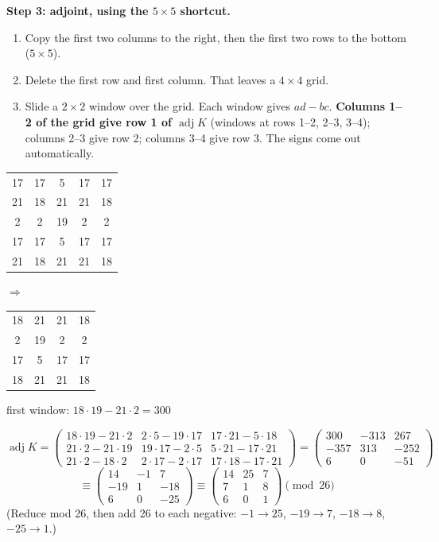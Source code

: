 \textbf{Step 3: adjoint, using the $5\times5$ shortcut.}
\begin{enumerate}[leftmargin=1.5em]
  \item Copy the first two columns to the right, then the first two rows to the bottom ($5\times5$).
  \item Delete the first row and first column. That leaves a $4\times4$ grid.
  \item Slide a $2\times2$ window over the grid. Each window gives $ad - bc$.
  \textbf{Columns 1--2 of the grid give row 1 of $\operatorname{adj}K$} (windows at rows 1--2, 2--3, 3--4); columns 2--3 give row 2; columns 3--4 give row 3. The signs come out automatically.
\end{enumerate}
\begin{center}\small
\begin{tabular}{ccccc}
\color{gray}17&\color{gray}17&\color{gray}5&\color{gray}17&\color{gray}17\\
\color{gray}21&18&21&21&18\\
\color{gray}2&2&19&2&2\\
\color{gray}17&17&5&17&17\\
\color{gray}21&18&21&21&18
\end{tabular}
\quad$\Rightarrow$\quad
\begin{tabular}{|cc|cc|}
\hline
\cellcolor{cyan!20}18&\cellcolor{cyan!20}21&21&18\\
\cellcolor{cyan!20}2&\cellcolor{cyan!20}19&2&2\\
17&5&17&17\\
18&21&21&18\\
\hline
\end{tabular}
\quad
{\footnotesize first window: $18\cdot19 - 21\cdot2 = 300$}
\end{center}
\[
\operatorname{adj}K =
\begin{pmatrix}
18\cdot19-21\cdot2 & 2\cdot5-19\cdot17 & 17\cdot21-5\cdot18\\
21\cdot2-21\cdot19 & 19\cdot17-2\cdot5 & 5\cdot21-17\cdot21\\
21\cdot2-18\cdot2 & 2\cdot17-2\cdot17 & 17\cdot18-17\cdot21
\end{pmatrix}
=
\begin{pmatrix}300&-313&267\\-357&313&-252\\6&0&-51\end{pmatrix}
\]
\[
\equiv
\begin{pmatrix}14&-1&7\\-19&1&-18\\6&0&-25\end{pmatrix}
\equiv
\begin{pmatrix}14&25&7\\7&1&8\\6&0&1\end{pmatrix} \pmod{26}
\]
(Reduce mod 26, then add 26 to each negative: $-1\to25$, $-19\to7$, $-18\to8$, $-25\to1$.)

